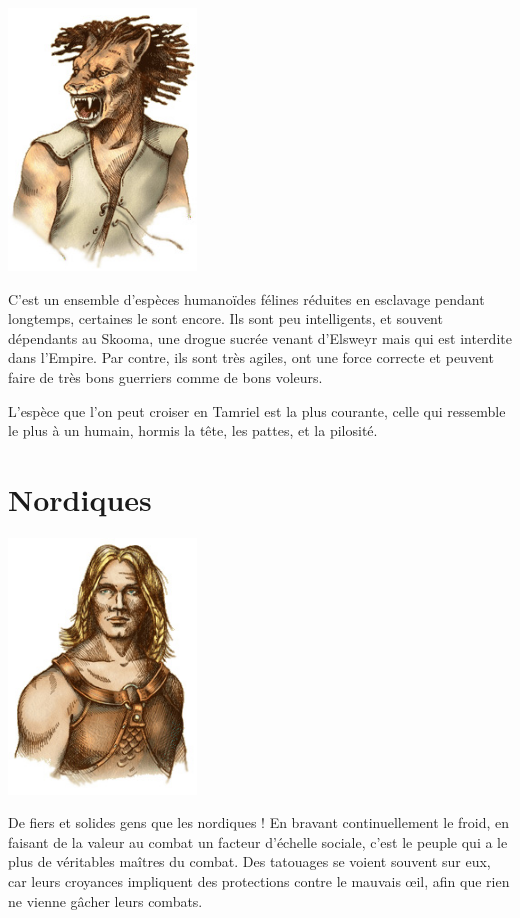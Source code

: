   \begin{center}
  \includegraphics[width=5cm]{images/race_khajiit.jpg}
  \end{center}
  
  C'est un ensemble d'espèces humanoïdes félines réduites en esclavage pendant longtemps, certaines le sont encore. Ils sont peu intelligents, et souvent dépendants au Skooma, une drogue sucrée venant d'Elsweyr mais qui est interdite dans l'Empire. Par contre, ils sont très agiles, ont une force correcte et peuvent faire de très bons guerriers comme de bons voleurs.
  
  L'espèce que l'on peut croiser en Tamriel est la plus courante, celle qui ressemble le plus à un humain, hormis la tête, les pattes, et la pilosité.

  \section{Nordiques}

  \begin{center}
  \includegraphics[width=5cm]{images/race_nordique.jpg}
  \end{center}
  
  De fiers et solides gens que les nordiques ! En bravant continuellement le froid, en faisant de la valeur au combat un facteur d'échelle sociale, c'est le peuple qui a le plus de véritables maîtres du combat. Des tatouages se voient souvent sur eux, car leurs croyances impliquent des protections contre le mauvais œil, afin que rien ne vienne gâcher leurs combats.
  
